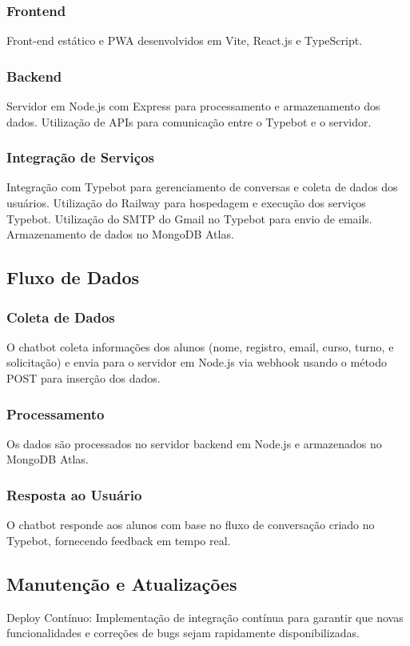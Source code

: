 \documentclass[12pt,a4paper]{article} %
\begin{document}
\subsubsection{Frontend}
Front-end estático e PWA desenvolvidos em Vite, React.js e TypeScript.

\subsubsection{Backend}
Servidor em Node.js com Express para processamento e armazenamento dos dados. Utilização de APIs para comunicação entre o Typebot e o servidor.

\subsubsection{Integração de Serviços}
Integração com Typebot para gerenciamento de conversas e coleta de dados dos usuários. Utilização do Railway para hospedagem e execução dos serviços Typebot. Utilização do SMTP do Gmail no Typebot para envio de emails. Armazenamento de dados no MongoDB Atlas.

\subsection{Fluxo de Dados}

\subsubsection{Coleta de Dados}
O chatbot coleta informações dos alunos (nome, registro, email, curso, turno, e solicitação) e envia para o servidor em Node.js via webhook usando o método POST para inserção dos dados.

\subsubsection{Processamento}
Os dados são processados no servidor backend em Node.js e armazenados no MongoDB Atlas.

\subsubsection{Resposta ao Usuário}
O chatbot responde aos alunos com base no fluxo de conversação criado no Typebot, fornecendo feedback em tempo real.

\subsection{Manutenção e Atualizações}
Deploy Contínuo: Implementação de integração contínua para garantir que novas funcionalidades e correções de bugs sejam rapidamente disponibilizadas.
\end{document}
